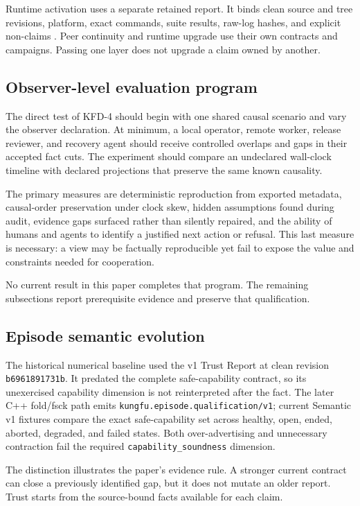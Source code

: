 Runtime activation uses a separate retained report. It binds clean source and
tree revisions, platform, exact commands, suite results, raw-log hashes, and
explicit non-claims \cite{kungfu2026runtimequalification}. Peer continuity and
runtime upgrade use their own contracts and campaigns. Passing one layer does
not upgrade a claim owned by another.

\subsection{Observer-level evaluation program}

The direct test of KFD-4 should begin with one shared causal scenario and vary
the observer declaration. At minimum, a local operator, remote worker, release
reviewer, and recovery agent should receive controlled overlaps and gaps in
their accepted fact cuts. The experiment should compare an undeclared
wall-clock timeline with declared projections that preserve the same known
causality.

The primary measures are deterministic reproduction from exported metadata,
causal-order preservation under clock skew, hidden assumptions found during
audit, evidence gaps surfaced rather than silently repaired, and the ability of
humans and agents to identify a justified next action or refusal. This last
measure is necessary: a view may be factually reproducible yet fail to expose
the value and constraints needed for cooperation.

No current result in this paper completes that program. The remaining
subsections report prerequisite evidence and preserve that qualification.

\subsection{Episode semantic evolution}

The historical numerical baseline used the v1 Trust Report at clean revision
\texttt{b6961891731b}. It predated the complete safe-capability contract, so its
unexercised capability dimension is not reinterpreted after the fact. The later
C++ fold/fsck path emits \texttt{kungfu.episode.qualification/v1}; current
Semantic v1 fixtures compare the exact safe-capability set across healthy,
open, ended, aborted, degraded, and failed states. Both over-advertising and
unnecessary contraction fail the required \texttt{capability\_soundness}
dimension.

The distinction illustrates the paper's evidence rule. A stronger current
contract can close a previously identified gap, but it does not mutate an older
report. Trust starts from the source-bound facts available for each claim.

